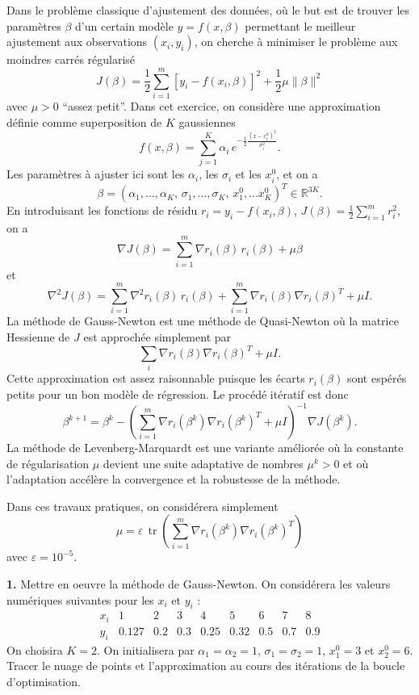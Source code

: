 \documentclass[11pt, a4paper]{amsart}
\begin{document}
Dans le problème classique d'ajustement des données, 
où le but est de trouver les paramètres $\beta$ d'un certain modèle $y=f(x,\beta)$
permettant le meilleur ajustement aux observations $(x_i,y_i)$,
on cherche à minimiser le problème aux moindres carrés régularisé
\[
J(\beta) = \frac{1}{2}\sum_{i=1}^m \left[ y_i -f(x_i,\beta) \right]^2
+ \frac{1}{2}\mu \|\beta\|^2
\]
avec $\mu>0$ ``assez petit''.  Dans cet exercice, on considère une approximation définie comme superposition
de $K$ gaussiennes
\[
f(x,\beta) = \sum_{j=1}^K \alpha_i\, e^{-\frac{1}{2}\frac{(x-x_i^0)^2}{\sigma_i^2}}.
\]
Les paramètres à ajuster ici sont les $\alpha_i$, les $\sigma_i$ et
les $x_i^0$, et on a 
\[
\beta = (\alpha_1,...,\alpha_K,\,\sigma_1,...,\sigma_K,\,x_1^0,...x_K^0)^T
\in \mathbb{R}^{3K}.
\]
En introduisant les fonctions de résidu $r_i=y_i - f(x_i,\beta)$,
$J(\beta) = \frac{1}{2}\sum_{i=1}^m r_i^2$,  on a
\[
\nabla J(\beta) = \sum_{i=1}^m\nabla r_i(\beta) \, r_i(\beta)
+\mu \beta
\]
et
\[
\nabla^2 J(\beta) = 
\sum_{i=1}^m \nabla^2 r_i(\beta)\, r_i(\beta)
+\sum_{i=1}^m \nabla r_i(\beta) \nabla r_i(\beta)^T  + \mu I.
\]
La méthode de Gauss-Newton est une méthode de Quasi-Newton où
la matrice Hessienne de $J$ est approchée simplement par
\[
\sum_i \nabla r_i(\beta) \nabla r_i(\beta)^T + \mu I.
\]
Cette approximation est assez raisonnable puisque les écarts $r_i(\beta)$
sont espérés petits pour un bon modèle de régression. Le procédé itératif 
est donc
\[
\beta^{k+1} = \beta^k - \left(\sum_{i=1}^m \nabla r_i(\beta^k) \nabla r_i(\beta^k)^T + \mu I\right)^{-1} \nabla J(\beta^k).
\]
%
La méthode de Levenberg-Marquardt est une variante améliorée où la constante de 
régularisation $\mu$ devient une suite adaptative de nombres $\mu^k>0$ et
où l'adaptation accélère la convergence et la robustesse de la méthode.

Dans ces travaux pratiques, on considérera simplement
\[
\mu = \varepsilon\, \mathop{tr}\left(\sum_{i=1}^m \nabla r_i(\beta^k) \nabla r_i(\beta^k)^T \right)
\]
avec $\varepsilon=10^{-5}$.

\textbf{1.} Mettre en oeuvre la méthode de Gauss-Newton. On considérera les
valeurs numériques suivantes pour les $x_i$ et $y_i$ :
\[
\begin{array}{lrrrrrrrr}
x_i & 1 & 2 & 3 & 4 & 5 & 6 & 7 & 8 \\ [1.1ex]
y_i & 0.127 & 0.2 & 0.3 & 0.25 & 0.32 & 0.5 & 0.7 & 0.9
\end{array} 
\]
On choisira $K=2$. On initialisera par $\alpha_1=\alpha_2=1$,
$\sigma_1=\sigma_2=1$, $x_1^0=3$ et $x_2^0=6$. Tracer le nuage de points
et l'approximation au cours des itérations de la boucle d'optimisation.
\end{document}
